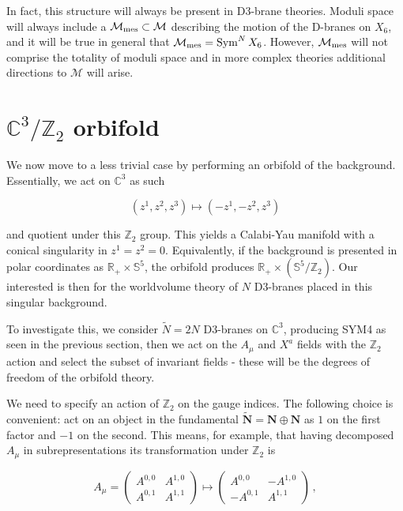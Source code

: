 In fact, this structure will always be present in D3-brane theories. Moduli space will always include a $\mathcal{M}_\mathrm{mes} \subset \mathcal{M}$ describing the motion of the D-branes on $X_6$, and it will be true in general that $\mathcal{M}_\mathrm{mes} = \operatorname{Sym}^N X_6$. However, $\mathcal{M}_\mathrm{mes}$ will not comprise the totality of moduli space and in more complex theories additional directions to $\mathcal{M}$ will arise.

\section{$\mathbb{C}^3/\mathbb{Z}_2$ orbifold}

We now move to a less trivial case by performing an orbifold of the background. Essentially, we act on $\mathbb{C}^3$ as such

\begin{equation}
	(z^1, z^2, z^3) \mapsto (-z^1, -z^2, z^3)
	\label{}
\end{equation}

and quotient under this $\mathbb{Z}_2$ group. This yields a Calabi-Yau manifold with a conical singularity in $z^1 = z^2 =0$. Equivalently, if the background is presented in polar coordinates as $\mathbb{R}_+ \times \mathbb{S}^5$, the orbifold produces $\mathbb{R}_+ \times (\mathbb{S}^5 / \mathbb{Z}_2)$. Our interested is then for the worldvolume theory of $N$ D3-branes placed in this singular background.

To investigate this, we consider $\tilde N = 2N$ D3-branes on $\mathbb{C}^3$, producing SYM4 as seen in the previous section, then we act on the $A_\mu$ and $X^a$ fields with the $\mathbb{Z}_2$ action and select the subset of invariant fields - these will be the degrees of freedom of the orbifold theory.

We need to specify an action of $\mathbb{Z}_2$ on the gauge indices. The following choice is convenient: act on an object in the fundamental $\mathbf{\tilde N} = \mathbf{N} \oplus \mathbf{N}$ as $1$ on the first factor and $-1$ on the second. This means, for example, that having decomposed $A_\mu$ in subrepresentations its transformation under $\mathbb{Z}_2$ is

\begin{equation}
	A_\mu = \begin{pmatrix}
		A^{0,0} & A^{1,0} \\
		A^{0,1} & A^{1,1}
	\end{pmatrix} \mapsto \begin{pmatrix}
		A^{0,0} & -A^{1,0} \\
		-A^{0,1} & A^{1,1}
	\end{pmatrix}\,,
\end{equation}

